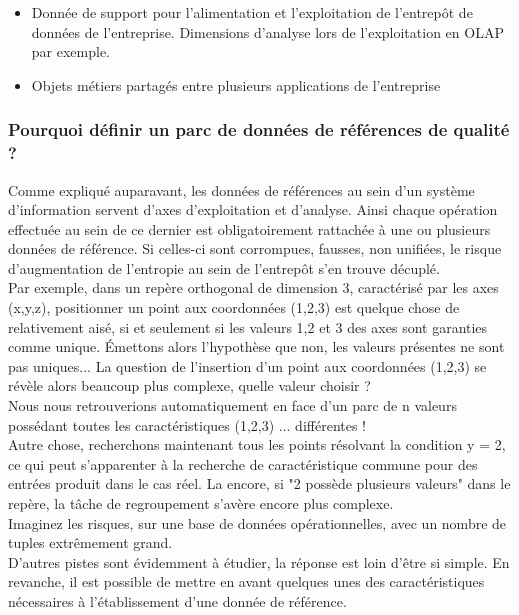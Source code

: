 \begin{itemize}
\item Donnée de support pour l'alimentation et l'exploitation de l'entrepôt de données de l'entreprise. Dimensions d'analyse lors de l'exploitation en OLAP par exemple.
\item Objets métiers partagés entre plusieurs applications de l'entreprise
\end{itemize}

\subsubsection{Pourquoi définir un parc de données de références de qualité ?}

Comme expliqué auparavant, les données de références au sein d'un système d'information servent d'axes d'exploitation et d'analyse. Ainsi chaque opération effectuée au sein de ce dernier est obligatoirement rattachée à une ou plusieurs données de référence. Si celles-ci sont corrompues, fausses, non unifiées, le risque d'augmentation de l'entropie au sein de l'entrepôt s'en trouve décuplé.\\
Par exemple, dans un repère orthogonal de dimension 3, caractérisé par les axes (x,y,z), positionner un point aux coordonnées (1,2,3) est quelque chose de relativement aisé, si et seulement si les valeurs 1,2 et 3 des axes sont garanties comme unique.
Émettons alors l'hypothèse que non, les valeurs présentes ne sont pas uniques... La question de l'insertion d'un point aux coordonnées (1,2,3) se révèle alors beaucoup plus complexe, quelle valeur choisir ? \\ 
Nous nous retrouverions automatiquement en face d'un parc de n valeurs possédant toutes les caractéristiques (1,2,3) ... différentes !\\
Autre chose, recherchons maintenant tous les points résolvant la condition y = 2, ce qui peut s'apparenter à la recherche de caractéristique commune pour des entrées produit dans le cas réel.
La encore, si "2 possède plusieurs valeurs" dans le repère, la tâche de regroupement s'avère encore plus complexe.\\
Imaginez les risques, sur une base de données opérationnelles, avec un nombre de tuples extrêmement grand.\\

D'autres pistes sont évidemment à étudier, la réponse est loin  d'être si simple. En revanche, il est possible de mettre en avant quelques unes des caractéristiques nécessaires à l'établissement d'une donnée de référence.\\

